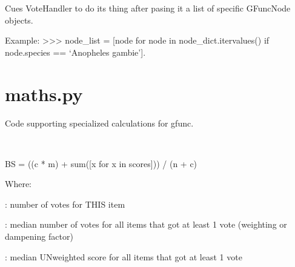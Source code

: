 \documentclass[letterpaper,10pt,english]{sphinxmanual}
\begin{document}
\begin{fulllineitems}
\begin{fulllineitems}
\end{fulllineitems}


\begin{fulllineitems}
\label{code:gfunc.graphTools.GraphHandler.take_votes}
Cues VoteHandler to do its thing after pasing it a list of specific
GFuncNode objects.

Example:
\textgreater{}\textgreater{}\textgreater{} node\_list = {[}node for node in node\_dict.itervalues() if node.species == `Anopheles gambie'{]}.

\end{fulllineitems}


\end{fulllineitems}

\label{code:module-gfunc.maths}

\section{maths.py}
\label{code:maths-py}
Code supporting specialized calculations for gfunc.

\begin{fulllineitems}
\label{code:gfunc.maths.bayesian_score}~
\begin{DUlineblock}{0em}
\item[] BS = ((c * m) + sum({[}x for x in scores{]})) / (n + c)
\item[] 
\item[] Where:
\item[] 
\item[] : number of votes for THIS item
\item[] : median number of votes for all items that got at least 1 vote (weighting or dampening factor)
\item[] : median UNweighted score for all items that got at least 1 vote  
\end{DUlineblock}

\end{fulllineitems}

\end{document}
